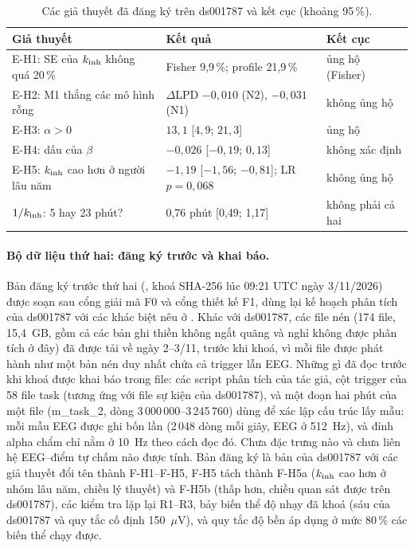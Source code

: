 \begin{table}[H]
\centering\footnotesize
\caption{Các giả thuyết đã đăng ký trên ds001787 và kết cục (khoảng 95\,\%).}
\label{tab:real-tests}
\setlength{\tabcolsep}{4pt}
\begin{tabular}{lll}
\toprule
Giả thuyết & Kết quả & Kết cục \\
\midrule
E-H1: SE của $k_{\mathrm{inh}}$ không quá 20\,\% & Fisher 9,9\,\%; profile 21,9\,\% & ủng hộ (Fisher) \\
E-H2: M1 thắng các mô hình rỗng & $\Delta$LPD $-0{,}010$ (N2), $-0{,}031$ (N1) & không ủng hộ \\
E-H3: $\alpha>0$ & $13{,}1$ [$4{,}9$; $21{,}3$] & ủng hộ \\
E-H4: dấu của $\beta$ & $-0{,}026$ [$-0{,}19$; $0{,}13$] & không xác định \\
E-H5: $k_{\mathrm{inh}}$ cao hơn ở người lâu năm & $-1{,}19$ [$-1{,}56$; $-0{,}81$]; LR $p=0{,}068$ & không ủng hộ \\
$1/k_{\mathrm{inh}}$: 5 hay 23 phút? & 0,76 phút [0,49; 1,17] & không phải cả hai \\
\bottomrule
\end{tabular}
\end{table}

\paragraph{Bộ dữ liệu thứ hai: đăng ký trước và khai báo.} Bản đăng ký trước thứ hai (, khoá SHA-256 lúc 09:21 UTC ngày 3/11/2026) được soạn sau cổng giải mã F0 và cổng thiết kế F1, dùng lại kế hoạch phân tích của ds001787 với các khác biệt nêu ở . Khác với ds001787, các file nén (174 file, 15,4~GB, gồm cả các bản ghi thiền không ngắt quãng và nghỉ không được phân tích ở đây) đã được tải về ngày 2--3/11, trước khi khoá, vì mỗi file được phát hành như một bản nén duy nhất chứa cả trigger lẫn EEG. Những gì đã đọc trước khi khoá được khai báo trong file: các script phân tích của tác giả, cột trigger của 58 file task (tương ứng với file sự kiện của ds001787), và một đoạn hai phút của một file (m\_task\_2, dòng 3\,000\,000--3\,245\,760) dùng để xác lập cấu trúc lấy mẫu: mỗi mẫu EEG được ghi bốn lần (2\,048 dòng mỗi giây, EEG ở 512~Hz), và đỉnh alpha chẩm chỉ nằm ở 10~Hz theo cách đọc đó. Chưa đặc trưng nào và chưa liên hệ EEG--điểm tự chấm nào được tính. Bản đăng ký là bản của ds001787 với các giả thuyết đổi tên thành F-H1--F-H5, F-H5 tách thành F-H5a ($k_{\mathrm{inh}}$ cao hơn ở nhóm lâu năm, chiều lý thuyết) và F-H5b (thấp hơn, chiều quan sát được trên ds001787), các kiểm tra lặp lại R1--R3, bảy biến thể độ nhạy đã khoá (sáu của ds001787 và quy tắc cố định 150~$\mu$V), và quy tắc độ bền áp dụng ở mức 80\,\% các biến thể chạy được.

